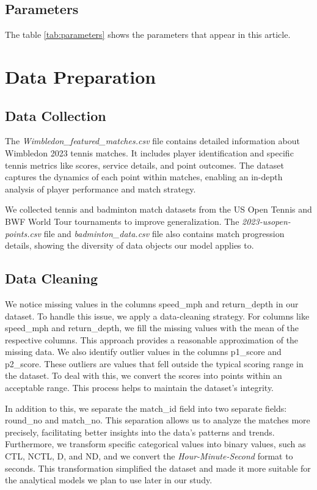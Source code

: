 \documentclass{mcmthesis}
\begin{document}
\subsection{Parameters}
The table \ref{tab:parameters} shows the parameters that appear in this article.

\section{Data Preparation}
\subsection{Data Collection}
The \emph{Wimbledon\_featured\_matches.csv} file contains detailed information about Wimbledon 2023 tennis matches. It includes player identification and specific tennis metrics like scores, service details, and point outcomes. The dataset captures the dynamics of each point within matches, enabling an in-depth analysis of player performance and match strategy.

We collected tennis and badminton match datasets from the US Open Tennis and BWF World Tour tournaments to improve generalization. The \emph{2023-usopen-points.csv} file and \emph{badminton\_data.csv} file also contains match progression details, showing the diversity of data objects our model applies to.

\subsection{Data Cleaning}
We notice missing values in the columns speed\_mph and return\_depth in our dataset. To handle this issue, we apply a data-cleaning strategy. For columns like speed\_mph and return\_depth, we fill the missing values with the mean of the respective columns. This approach provides a reasonable approximation of the missing data. We also identify outlier values in the columns p1\_score and p2\_score. These outliers are values that fell outside the typical scoring range in the dataset. To deal with this, we convert the scores into points within an acceptable range. This process helps to maintain the dataset's integrity.

In addition to this, we separate the match\_id field into two separate fields: round\_no and match\_no. This separation allows us to analyze the matches more precisely, facilitating better insights into the data's patterns and trends. Furthermore, we transform specific categorical values into binary values, such as CTL, NCTL, D, and ND, and we convert the \emph{Hour-Minute-Second} format to seconds. This transformation simplified the dataset and made it more suitable for the analytical models we plan to use later in our study.
\end{document}
